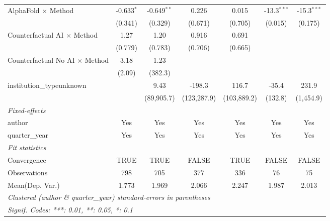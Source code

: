 \begin{tabular}{lcccccc}
   AlphaFold $\times$ Method             & -0.633$^{*}$ & -0.649$^{**}$ & 0.226       & 0.015       & -13.3$^{***}$ & -15.3$^{***}$\\   
                                         & (0.341)      & (0.329)       & (0.671)     & (0.705)     & (0.015)       & (0.175)\\   
   Counterfactual AI $\times$ Method     & 1.27         & 1.20          & 0.916       & 0.691       &               &   \\   
                                         & (0.779)      & (0.783)       & (0.706)     & (0.665)     &               &   \\   
   Counterfactual No AI $\times$ Method  & 3.18         & 1.23          &             &             &               &   \\   
                                         & (2.09)       & (382.3)       &             &             &               &   \\   
   institution\_typeunknown              &              & 9.43          & -198.3      & 116.7       & -35.4         & 231.9\\   
                                         &              & (89,905.7)    & (123,287.9) & (103,889.2) & (132.8)       & (1,454.9)\\   
   \midrule
   \emph{Fixed-effects}\\
   author                                & Yes          & Yes           & Yes         & Yes         & Yes           & Yes\\  
   quarter\_year                         & Yes          & Yes           & Yes         & Yes         & Yes           & Yes\\  
   \midrule
   \emph{Fit statistics}\\
   Convergence                           &TRUE          & TRUE          & FALSE       & TRUE        & FALSE         & FALSE\\  
   Observations                          & 798          & 705           & 377         & 336         & 76            & 75\\  
Mean(Dep. Var.) & 1.773 & 1.969 & 2.066 & 2.247 & 1.987 & 2.013 \\
   \midrule \midrule
   \multicolumn{7}{l}{\emph{Clustered (author \& quarter\_year) standard-errors in parentheses}}\\
   \multicolumn{7}{l}{\emph{Signif. Codes: ***: 0.01, **: 0.05, *: 0.1}}\\
\end{tabular}
\par\endgroup
